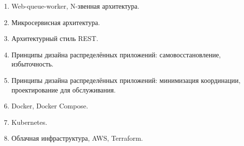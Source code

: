 \documentclass[a5paper]{article}
\begin{document}
\begin{enumerate}
    \item Web-queue-worker, N-звенная архитектура.
    \item Микросервисная архитектура.
    \item Архитектурный стиль REST.
    \item Принципы дизайна распределённых приложений: самовосстановление, избыточность.
    \item Принципы дизайна распределённых приложений: минимизация координации, проектирование для обслуживания.
    \item Docker, Docker Compose.
    \item Kubernetes.
    \item Облачная инфраструктура, AWS, Terraform.
\end{enumerate}
\end{document}
